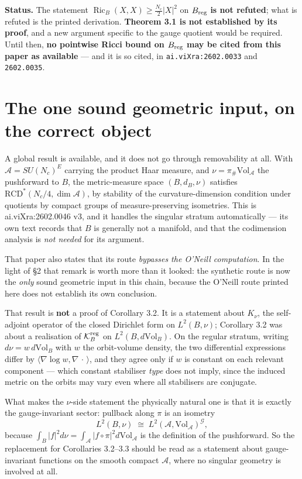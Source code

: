 \documentclass[11pt]{article}
\newcommand{\A}{\mathcal A}
\newcommand{\G}{\mathcal G}
\begin{document}
\medskip
\noindent
\textbf{Status.} The statement
$\operatorname{Ric}_B(X,X)\ge\frac{N_c}{2}|X|^2$ on $B_{\rm reg}$ \textbf{is not
refuted}; what is refuted is the printed derivation. \textbf{Theorem 3.1 is not
established by its proof}, and a new argument specific to the gauge quotient would be
required. Until then, \textbf{no pointwise Ricci bound on $B_{\rm reg}$ may be cited
from this paper as available} --- and it is so cited, in
\texttt{ai.viXra:2602.0033} and \texttt{2602.0035}.

\section{The one sound geometric input, on the correct object}

A global result is available, and it does not go through removability at all. With
$\A=SU(N_c)^E$ carrying the product Haar measure, and $\nu=\pi_\#\mathrm{Vol}_{\A}$
the pushforward to $B$, the metric-measure space $(B,d_B,\nu)$ satisfies
$\mathrm{RCD}^*(N_c/4,\dim\A)$, by stability of the curvature-dimension condition under
quotients by compact groups of measure-preserving isometries. This is
ai.viXra:2602.0046 v3, and it handles the singular stratum automatically --- its own
text records that $B$ is generally not a manifold, and that the codimension analysis
is \emph{not needed} for its argument.

That paper also states that its route \emph{bypasses the O'Neill computation}. In the
light of \S2 that remark is worth more than it looked: the synthetic route is now the
\emph{only} sound geometric input in this chain, because the O'Neill route printed
here does not establish its own conclusion.

That result is \textbf{not} a proof of Corollary 3.2. It is a statement about
$K_\nu$, the self-adjoint operator of the closed Dirichlet form on $L^2(B,\nu)$;
Corollary 3.2 was about a realisation of $\mathcal K_B^{\rm reg}$ on
$L^2(B,d\mathrm{Vol}_B)$. On the regular stratum, writing $d\nu=w\,d\mathrm{Vol}_B$
with $w$ the orbit-volume density, the two differential expressions differ by
$\langle\nabla\log w,\nabla\,\cdot\,\rangle$, and they agree only if $w$ is constant
on each relevant component --- which constant stabiliser \emph{type} does not imply,
since the induced metric on the orbits may vary even where all stabilisers are
conjugate.

What makes the $\nu$-side statement the physically natural one is that it is exactly
the gauge-invariant sector: pullback along $\pi$ is an isometry
\[
L^2(B,\nu)\;\cong\;L^2(\A,\mathrm{Vol}_{\A})^{\G},
\]
because $\int_B|f|^2d\nu=\int_{\A}|f\circ\pi|^2 d\mathrm{Vol}_{\A}$ is the definition
of the pushforward. So the replacement for Corollaries 3.2--3.3 should be read as a
statement about gauge-invariant functions on the smooth compact $\A$, where no
singular geometry is involved at all.
\end{document}
